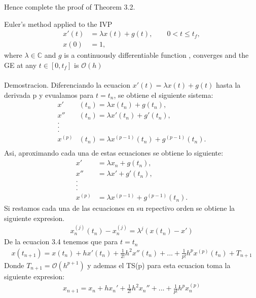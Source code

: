 \begin{enumerate}
		Hence complete the proof of Theorem 3.2.
		\begin{theorem}
			Euler's method applied to the IVP
			\begin{align*}
			x'(t) & = \lambda x(t) + g(t), \qquad 0<t\leq t_f,\\
			x(0) & = 1,
			\end{align*}
			where $\lambda \in \mathbb{C}$ and $g$ is a continuously differentiable function
			, converges and the GE at any $t \in [0, t_f]$ is $\mathcal{O}(h)$\\
			\\
			Demostracion. Diferenciando la ecuacion $x'(t) = \lambda x(t) + g(t)$ hasta la derivada p y evualamos para $t = t_n$, se obtiene el siguiente sistema:
			\begin{align*}
			x'&(t_n) = \lambda x(t_n) + g(t_n),\\
			x''&(t_n) = \lambda x'(t_n) + g'(t_n),\\
			.\\
			.\\
			.\\	
			x^{(p)}&(t_n) = \lambda x^{(p-1)}(t_n) + g^{(p-1)}(t_n).\\
			\end{align*}
			Asi, aproximando cada una de estas ecuaciones se obtiene lo siguiente:
			\begin{align*}
			x'& = \lambda x_n + g(t_n),\\
			x''& = \lambda x' + g'(t_n),\\
			.\\
			.\\
			.\\	
			x^(p)& = \lambda x^{(p-1)} + g^{(p-1)}(t_n).	
			\end{align*}
			Si restamos cada una de las ecuaciones en su repectivo orden se obtiene la siguiente expresion.
			\begin{align*}
				x_n^{(j)}(t_n) - x_n^{(j)} = \lambda^j(x(t_n) - x')
			\end{align*}
			De la ecuacion 3.4 tenemos que para $t = t_n$
			\begin{align*}
			x(t_{n+1}) = x(t_n) + hx'(t_n) + \frac{1}{2!}h^2x''(t_n) + ... + \frac{1}{p!}h^p x^{(p)}(t_n) + T_{n+1}
			\end{align*}
			Donde $T_{n+1} = \mathcal{O}(h^{p+1})$ y ademas el TS(p) para esta ecuacion toma la siguiente expresion:
			\begin{align*}
			x_{n+1} = x_n + hx_n' + \frac{1}{2!}h^2x_n'' + ... + \frac{1}{p!}h^px_n^{(p)}
			\end{align*}

\end{theorem}
\end{enumerate}
